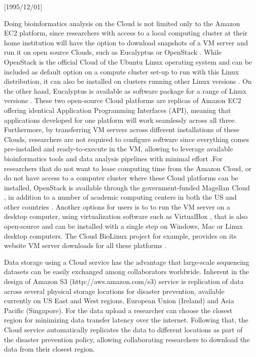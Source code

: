 \NeedsTeXFormat{LaTeX2e}[1995/12/01] \documentclass[10pt]{bmc_article}
\newenvironment{bmcformat}{\begin{raggedright}\baselineskip20pt\sloppy\setboolean{publ}{false}}{\end{raggedright}\baselineskip20pt\sloppy}
\begin{document}
\begin{bmcformat}
Doing bioinformatics analysis on the Cloud is not limited only to the Amazon EC2 platform, since researchers
with access to a local computing cluster at their home institution will have the option to download snapshots 
of a VM server and run it on open source Clouds, such as Eucalyptus \cite{euca} or OpenStack \cite{openstack}.
While OpenStack is the official Cloud of the Ubuntu Linux operating system \cite{ubuntucloud} and can be included 
as default option on a compute cluster set-up to run with this Linux distribution, it can also be installed on 
clusters running other Linux versions \cite{openstackother}. On the other hand, Eucalyptus is available as software 
package for a range of Linux versions \cite{eucalyptusother}. These two open-source Cloud platforms are replicas 
of Amazon EC2 offering identical Application Programming Interfaces (API), meaning that applications developed 
for one platform will work seamlessly across all three. Furthermore, by transferring VM servers across different 
installations of these Clouds, researchers are not required to configure software since everything comes pre-installed 
and ready-to-execute in the VM, allowing to leverage available bioinformatics tools and data analysis pipelines 
with minimal effort \cite{Krampis2012}.For researchers that do not want to lease computing time from the Amazon 
Cloud, or do not have access to a computer cluster where these Cloud platforms can be installed, OpenStack is 
available through the government-funded  Magellan Cloud \cite{magellan}, in addition to a number of academic 
computing centers in both the US and other countries \cite{openstackinstalls}. Another options for users is to
to run the VM server on a desktop computer, using virtualization software such as VirtualBox \cite{vbox}, that
is also open-source and can be installed with a single step on Windows, Mac or Linux desktop computers. The
Cloud BioLinux project for example, provides on its website VM server downloads for all these platforms \cite{cblorg}.

Data storage using a Cloud service has the advantage that large-scale sequencing datasets can be easily
exchanged among collaborators worldwide. Inherent in the design of Amazon S3 (http://aws.amazon.com/s3)
service is replication of data across several physical storage locations for disaster prevention, available
currently on US East and West regions, European Union (Ireland) and Asia Pacific (Singapore). For the data
upload a researcher can choose the closest region for minimizing data transfer latency over the internet.
Following that, the Cloud service automatically replicates the data to different locations as part of the
disaster prevention policy, allowing collaborating researchers to download the data from their closest region.


\end{bmcformat}
\end{document}
